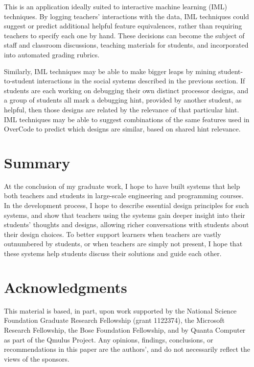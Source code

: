 \documentclass{sigchi}
\begin{document}
This is an application ideally suited to interactive machine learning (IML) techniques. By logging teachers' interactions with the data, IML techniques could suggest or predict additional helpful feature equivalences, rather than requiring teachers to specify each one by hand. These decisions can become the subject of staff and classroom discussions, teaching materials for students, and incorporated into automated grading rubrics.

Similarly, IML techniques may be able to make bigger leaps by mining student-to-student interactions in the social systems described in the previous section. If students are each working on debugging their own distinct processor designs, and a group of students all mark a debugging hint, provided by another student, as helpful, then those designs are related by the relevance of that particular hint. IML techniques may be able to suggest combinations of the same features used in OverCode to predict which designs are similar, based on shared hint relevance.

\section{Summary}
At the conclusion of my graduate work, I hope to have built systems that help both teachers and students in large-scale engineering and programming courses. In the development process, I hope to describe essential design principles for such systems, and show that teachers using the systems gain deeper insight into their students' thoughts and designs, allowing richer conversations with students about their design choices. To better support learners when teachers are vastly outnumbered by students, or when teachers are simply not present, I hope that these systems help students discuss their solutions and guide each other.

\section{Acknowledgments}

This material is based, in part, upon work supported by the National Science Foundation Graduate Research Fellowship (grant 1122374), the Microsoft Research Fellowship, the Bose Foundation Fellowship, and by Quanta Computer as part of the Qmulus Project. Any opinions, findings, conclusions, or recommendations in this paper are the authors', and do not necessarily reflect the views of the sponsors.
\end{document}
